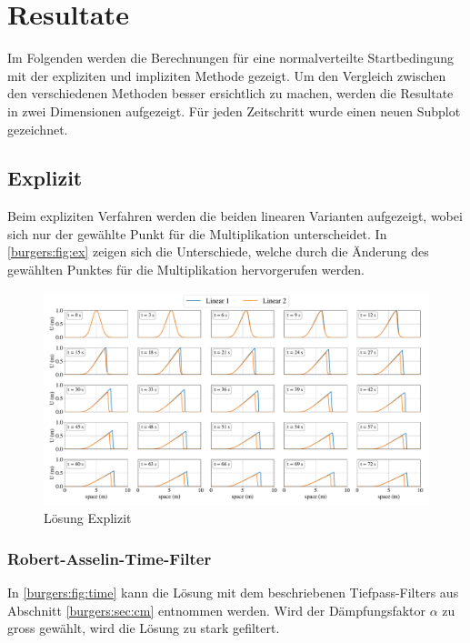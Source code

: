 %
%
\section{Resultate
\label{burgers:section:results}}

	Im Folgenden werden die Berechnungen f\"ur eine normalverteilte Startbedingung mit der expliziten und impliziten Methode gezeigt.
	Um den Vergleich zwischen den verschiedenen Methoden besser ersichtlich zu machen, werden die Resultate in zwei Dimensionen aufgezeigt.
	F\"ur jeden Zeitschritt wurde einen neuen Subplot gezeichnet.

	\subsection{Explizit}

	Beim expliziten Verfahren werden die beiden linearen Varianten aufgezeigt,
	wobei sich nur der gew\"ahlte Punkt f\"ur die Multiplikation unterscheidet.
	In \autoref{burgers:fig:ex} zeigen sich die Unterschiede, welche durch die \"Anderung des gewählten Punktes für die Multiplikation hervorgerufen werden.


    \begin{figure}
	\centering
	\includegraphics[width=1\textwidth]{papers/burgers/BurgersEquation/lin_paper.pdf}
	\caption{L\"osung Explizit}
	\label{burgers:fig:ex}
	\end{figure}

	\subsubsection{Robert-Asselin-Time-Filter}
	In \autoref{burgers:fig:time} kann die L\"osung mit dem beschriebenen Tiefpass-Filters aus Abschnitt \ref{burgers:sec:cm} entnommen werden.
	Wird der D\"ampfungsfaktor $\alpha$ zu gross gew\"ahlt, wird die L\"osung zu stark gefiltert.

